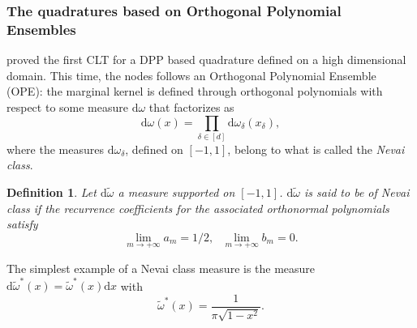 \documentclass[twoside,11pt]{book}
\newtheorem{definition}{Definition}
\numberwithin{theorem}{chapter}
\numberwithin{definition}{chapter}
\numberwithin{proposition}{chapter}
\numberwithin{corollary}{chapter}
\numberwithin{example}{chapter}
\numberwithin{lemma}{chapter}
\begin{document}



\subsubsection{The quadratures based on Orthogonal Polynomial Ensembles}
\cite{BaHa16} proved the first CLT for a DPP based quadrature defined on a high dimensional domain. This time, the nodes follows an Orthogonal Polynomial Ensemble (OPE): the marginal kernel is  defined through orthogonal polynomials with respect to some measure $\mathrm{d}\omega$ that factorizes as
\begin{equation}
\mathrm{d}\omega(x) = \prod\limits_{\delta \in [d]} \mathrm{d}\omega_{\delta}(x_{\delta}),
\end{equation}
where the measures $\mathrm{d}\omega_{\delta}$, defined on $[-1,1]$, belong to what is called the \emph{Nevai class}. 
\begin{definition}
Let $\mathrm{d}\tilde{\omega}$ a measure supported on $[-1,1]$. $\mathrm{d}\tilde{\omega}$ is said to be of Nevai class if 
the recurrence coefficients for
the associated orthonormal polynomials satisfy
\begin{equation}
\lim\limits_{m \rightarrow +\infty} a_{m} = 1/2, \:\:\: \lim\limits_{m \rightarrow +\infty} b_{m} = 0.
\end{equation}
\end{definition}
The simplest example of a Nevai class measure is the measure $\mathrm{d}\tilde{\omega}^{*}(x) = \tilde{\omega}^{*}(x) \mathrm{d}x$ with 
\begin{equation}
\tilde{\omega}^{*}(x) = \frac{1}{\pi\sqrt{1-x^{2}}}.
\end{equation}
\end{document}
